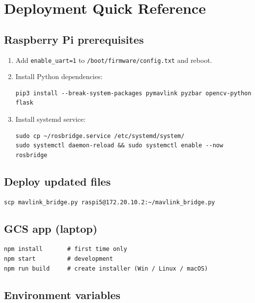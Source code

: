 \documentclass[11pt,a4paper]{article}
\begin{document}
\section{Deployment Quick Reference}

\subsection{Raspberry Pi prerequisites}

\begin{enumerate}
  \item Add \texttt{enable\_uart=1} to \texttt{/boot/firmware/config.txt} and reboot.
  \item Install Python dependencies:
  \begin{lstlisting}[style=bash]
pip3 install --break-system-packages pymavlink pyzbar opencv-python flask
  \end{lstlisting}
  \item Install systemd service:
  \begin{lstlisting}[style=bash]
sudo cp ~/rosbridge.service /etc/systemd/system/
sudo systemctl daemon-reload && sudo systemctl enable --now rosbridge
  \end{lstlisting}
\end{enumerate}

\subsection{Deploy updated files}

\begin{lstlisting}[style=bash, caption=SCP individual file to Pi]
scp mavlink_bridge.py raspi5@172.20.10.2:~/mavlink_bridge.py
\end{lstlisting}

\subsection{GCS app (laptop)}

\begin{lstlisting}[style=bash]
npm install       # first time only
npm start         # development
npm run build     # create installer (Win / Linux / macOS)
\end{lstlisting}

\subsection{Environment variables}
\end{document}
